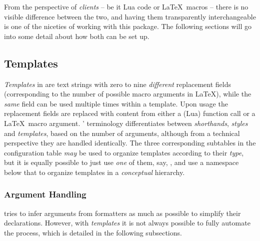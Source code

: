 \documentclass{scrartcl}
\begin{document}
From the perspective of \emph{clients} -- be it Lua code or \LaTeX\ macros --
there is no visible difference between the two, and having them transparently
interchangeable is one of the niceties of working with this package.  The
following sections will go into some detail about how both can be set up.


\subsection{Templates}
\label{sec:templates}

\emph{Templates} in  are text strings with zero to nine
\emph{different} replacement fields (corresponding to the number of possible
macro arguments in \LaTeX), while the \emph{same} field can be used multiple
times within a template.  Upon usage the replacement fields are replaced with
content from either a (Lua) function call or a \LaTeX\ macro argument.
' terminology differentiates between \emph{shorthands},
\emph{styles} and \emph{templates}, based on the number of arguments, although
from a technical perspective they are handled identically. The three
corresponding subtables in the configuration table \emph{may} be used to
organize templates according to their \emph{type}, but it is equally possible to
just use \emph{one} of them, say, , and use a namespace below
that to organize templates in a \emph{conceptual} hierarchy.


\subsubsection{Argument Handling}
\label{sec:templates-argument-handling}

 tries to infer arguments from formatters as much as
possible to simplify their declarations.  However, with \emph{templates} it is
not always possible to fully automate the process, which is detailed in the
following subsections.
\end{document}
